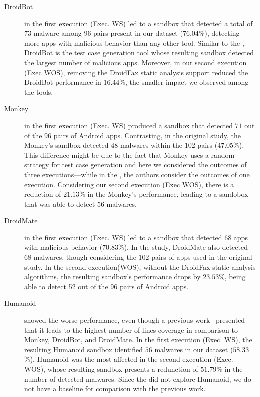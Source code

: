 \begin{description}
\item[DroidBot] in the first execution (Exec. WS) led to a sandbox that detected a total of $73$ malware among $96$ pairs present in our dataset ($76.04$\%),
  detecting more apps with malicious behavior than any other tool. Similar to the \blls, DroidBot is the test case generation tool
  whose resulting sandbox detected the largest number of malicious apps. Moreover, in our second execution (Exec WOS), removing the DroidFax
  static analysis support reduced the DroidBot performance in 16.44\%, the smaller impact we observed among the tools.

  \item [Monkey] in the first execution (Exec. WS) produced a sandbox that detected $71$ out of the $96$ pairs of Android apps.
    Contrasting, in the original study, the Monkey's sandbox detected $48$ malwares within the 102 pairs ($47.05$\%). This difference
    might be due to the fact that Monkey uses a random strategy for test case generation and here we considered the outcomes
    of three executions---while in the \blls, the authors consider the outcomes of one execution. 
    Considering our second execution (Exec WOS), there is a reduction of $21.13$\% in the Monkey's performance, leading to
    a sandobox that was able to detect $56$ malwares. 

  \item[DroidMate] in the first execution (Exec. WS) led to a sandbox that detected 68 apps with malicious behavior ($70.83$\%).
    In the \blls study, DroidMate also detected $68$ malwares, though considering the $102$ pairs of apps used in the
    original study. In the second execution(WOS),
    without the DroidFax static analysis algorithms, the resulting sandbox's performance drops by $23.53$\%, being able to detect
    52 out of the 96 pairs of Android apps.
    
  \item[Humanoid] showed the worse performance, even though a previous work~\cite{DBLP:conf/kbse/LiY0C19} presented that it leads to
    the highest number of lines coverage in comparison to Monkey, DroidBot, and DroidMate. In the first execution (Exec. WS),
    the resulting Humanoid sandbox identified $56$ malwares in our dataset ($58.33$\%). Humanoid was the most affected in the second
    execution (Exec. WOS), whose resulting sandbox presents a redunction of $51.79$\%  in the number of detected malwares.
    Since the \blls did not explore Humanoid,
    we do not have a baseline for comparison with the previous work.


\end{description}
